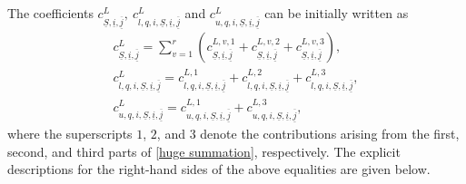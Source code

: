 \documentclass[12pt, a4paper]{article}
\begin{document}
The coefficients $c^L_{\underline S,\underline i,\underline{\overline j}},~c^L_{l,q,i,\underline S,\underline i,\underline{\overline j}}$ and $c^L_{u,q,i,\underline S,\underline i,\underline{\overline j}}$ can be initially written as
$$
\begin{array}{c}
c^L_{\underline S,\underline i,\underline{\overline j}}=\sum_{v=1}^r(c^{L,v,1}_{\underline S,\underline i,\underline{\overline j}}+c^{L,v,2}_{\underline S,\underline i,\underline{\overline j}}+c^{L,v,3}_{\underline S,\underline i,\underline{\overline j}}),\\
c^L_{l,q,i,\underline S,\underline i,\underline{\overline j}}=c^{L,1}_{l,q,i,\underline S,\underline i,\underline{\overline j}}+c^{L,2}_{l,q,i,\underline S,\underline i,\underline{\overline j}}+c^{L,3}_{l,q,i,\underline S,\underline i,\underline{\overline j}},\\
c^L_{u,q,i,\underline S,\underline i,\underline{\overline j}}=c^{L,1}_{u,q,i,\underline S,\underline i,\underline{\overline j}}+c^{L,3}_{u,q,i,\underline S,\underline i,\underline{\overline j}},
\end{array}
$$
where the superscripts $1$, $2$, and $3$ denote the contributions arising from the first, second, and third parts of \eqref{huge summation}, respectively. The explicit descriptions for the right-hand sides of the above equalities are given below. 
\end{document}
